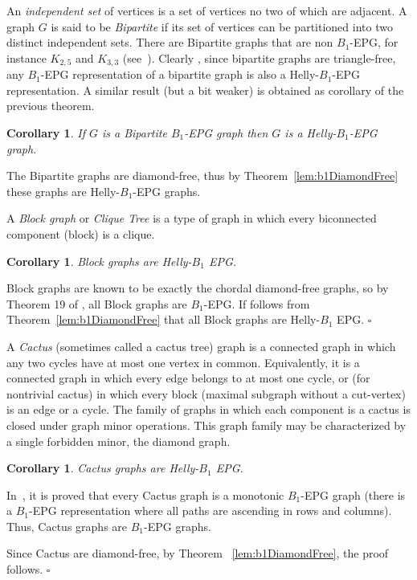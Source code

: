 \documentclass[9pt]{entcs}
\newtheorem{coro}[thm]{Corollary}%
\begin{document}
An \textit{independent set} of vertices is a set of vertices no two of which are adjacent.
A graph $G$ is said to be \textit{Bipartite} if its set of vertices can be partitioned into two distinct independent sets.
 There are Bipartite graphs that are non $B_1$-EPG, for instance $K_{2,5}$ and $K_{3,3}$ (see~\cite{cohen2014}). Clearly , since
 bipartite graphs are triangle-free, any $B_1$-EPG representation of a bipartite graph is also a Helly-$B_1$-EPG representation.
 A similar result (but a bit weaker) is obtained as corollary of the previous theorem. 


\begin{coro}
If $G$ is a Bipartite $B_1$-EPG graph then $G$ is a Helly-$B_1$-EPG graph.
\end{coro}

\begin{pf}
The Bipartite graphs are diamond-free, thus by Theorem~\ref{lem:b1DiamondFree} these graphs are Helly-$B_1$-EPG graphs.
\end{pf}

A \textit{Block graph} or \textit{Clique Tree} is a type of graph in which every biconnected component (block) is a clique.

\begin{coro}\label{lem:cdf}
 Block graphs are Helly-$B_1$ EPG.
\end{coro}

\begin{pf}
Block graphs are known to be exactly the chordal diamond-free graphs, so by   Theorem 19 of \cite{ries2009}, all Block graphs are  $B_1$-EPG. If follows from Theorem~\ref{lem:b1DiamondFree} that all Block graphs are Helly-$B_1$ EPG. 
 $\square$\end{pf} 

A \textit{Cactus} (sometimes called a cactus tree)  graph is a connected graph in which any two  cycles have at most one vertex in common. Equivalently, it is a connected graph in which every edge belongs to at most one  cycle, or (for nontrivial cactus) in which every block (maximal subgraph without a cut-vertex) is an edge or a cycle. The family of graphs in which each component is a cactus is closed under graph minor operations. This graph family may be characterized by a single forbidden minor, the diamond graph.
 
\begin{coro}
Cactus graphs are  Helly-$B_1$ EPG.
\end{coro}
\begin{pf}
In~\cite{cela2019monotonic}, it is proved that every Cactus graph is a monotonic $B_1$-EPG graph 
(there is a $B_1$-EPG representation where all paths are ascending in rows and columns). 
Thus, Cactus graphs are $B_1$-EPG graphs. 

Since Cactus are diamond-free, by Theorem ~\ref{lem:b1DiamondFree}, the proof follows.
$\square$\end{pf}
\end{document}
